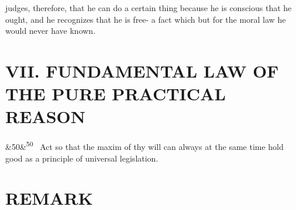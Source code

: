\documentclass[12pt]{article}
\newcommand{\para}[1][]{\par\noindent\ifx&#1&\else\textsuperscript{\footnotesize #1}~\fi}
\begin{document}
judges, therefore, that he can do a certain thing because he is conscious that he ought, and he recognizes that he is free- a fact which but for the moral law he would never have known.

\section*{VII. FUNDAMENTAL LAW OF THE PURE PRACTICAL REASON}

\para[50] Act so that the maxim of thy will can always at the same time hold good as a principle of universal legislation.

\section*{REMARK}
\end{document}
